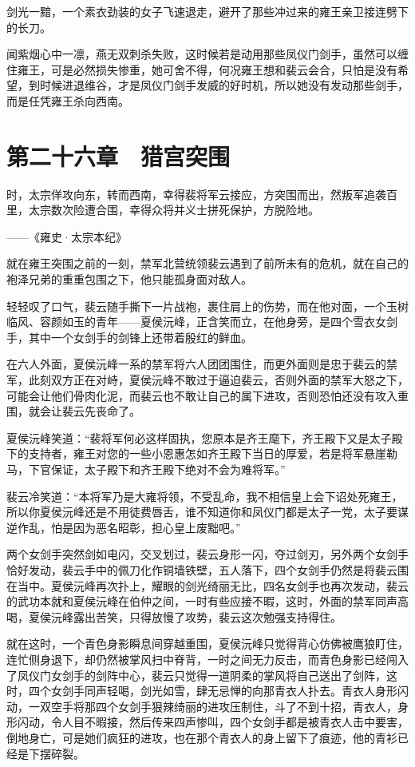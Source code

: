 剑光一黯，一个素衣劲装的女子飞速退走，避开了那些冲过来的雍王亲卫接连劈下的长刀。

闻紫烟心中一凛，燕无双刺杀失败，这时候若是动用那些凤仪门剑手，虽然可以缠住雍王，可是必然损失惨重，她可舍不得，何况雍王想和裴云会合，只怕是没有希望，到时候进退维谷，才是凤仪门剑手发威的好时机，所以她没有发动那些剑手，而是任凭雍王杀向西南。

\chapter{第二十六章　猎宫突围}

时，太宗佯攻向东，转而西南，幸得裴将军云接应，方突围而出，然叛军追袭百里，太宗数次险遭合围，幸得众将并义士拼死保护，方脱险地。

——《雍史·太宗本纪》

就在雍王突围之前的一刻，禁军北营统领裴云遇到了前所未有的危机，就在自己的袍泽兄弟的重重包围之下，他只能孤身面对敌人。

轻轻叹了口气，裴云随手撕下一片战袍，裹住肩上的伤势，而在他对面，一个玉树临风、容颜如玉的青年——夏侯沅峰，正含笑而立，在他身旁，是四个雪衣女剑手，其中一个女剑手的剑锋上还带着殷红的鲜血。

在六人外面，夏侯沅峰一系的禁军将六人团团围住，而更外面则是忠于裴云的禁军，此刻双方正在对峙，夏侯沅峰不敢过于逼迫裴云，否则外面的禁军大怒之下，可能会让他们骨肉化泥，而裴云也不敢让自己的属下进攻，否则恐怕还没有攻入重围，就会让裴云先丧命了。

夏侯沅峰笑道：“裴将军何必这样固执，您原本是齐王麾下，齐王殿下又是太子殿下的支持者，雍王对您的一些小恩惠怎如齐王殿下当日的厚爱，若是将军悬崖勒马，下官保证，太子殿下和齐王殿下绝对不会为难将军。”

裴云冷笑道：“本将军乃是大雍将领，不受乱命，我不相信皇上会下诏处死雍王，所以你夏侯沅峰还是不用徒费唇舌，谁不知道你和凤仪门都是太子一党，太子要谋逆作乱，怕是因为恶名昭彰，担心皇上废黜吧。”

两个女剑手突然剑如电闪，交叉划过，裴云身形一闪，夺过剑刃，另外两个女剑手恰好发动，裴云手中的佩刀化作铜墙铁壁，五人落下，四个女剑手仍然是将裴云围在当中。夏侯沅峰再次扑上，耀眼的剑光绮丽无比，四名女剑手也再次发动，裴云的武功本就和夏侯沅峰在伯仲之间，一时有些应接不暇，这时，外面的禁军同声高喝，夏侯沅峰露出苦笑，只得放慢了攻势，裴云这次勉强支持得住。

就在这时，一个青色身影瞬息间穿越重围，夏侯沅峰只觉得背心仿佛被鹰狼盯住，连忙侧身退下，却仍然被掌风扫中脊背，一时之间无力反击，而青色身影已经闯入了凤仪门女剑手的剑阵中心，裴云只觉得一道阴柔的掌风将自己送出了剑阵，这时，四个女剑手同声轻喝，剑光如雪，肆无忌惮的向那青衣人扑去。青衣人身形闪动，一双空手将那四个女剑手狠辣绮丽的进攻压制住，斗了不到十招，青衣人，身形闪动，令人目不暇接，然后传来四声惨叫，四个女剑手都是被青衣人击中要害，倒地身亡，可是她们疯狂的进攻，也在那个青衣人的身上留下了痕迹，他的青衫已经是下摆碎裂。

